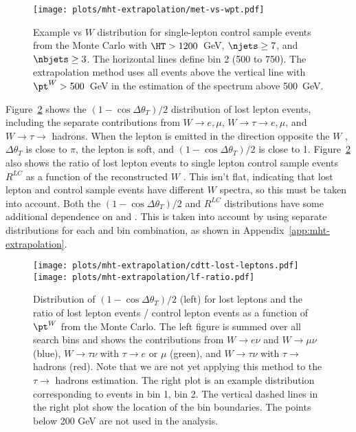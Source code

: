 \begin{figure}[!h]
  \centering
  \texttt{[image: plots/mht-extrapolation/met-vs-wpt.pdf]}
  \caption{ Example \MHT vs $W$ \pt distribution for single-lepton control sample events
    from the \ttbar Monte Carlo with $\HT>1200$~GeV, $\njets\ge 7$, and $\nbjets\ge3$.
    The horizontal lines define \MHT bin 2 (500 to 750).  The \MHT extrapolation
    method uses all events above the vertical line with $\pt^W>500$~GeV in the estimation
    of the \MHT spectrum above 500~GeV.
  }
  \label{fig:met-vs-wpt}
\end{figure}


Figure~\ref{fig:cdtt-lf-ratio} shows the $\left( 1 - \cos \Delta \theta_T \right) / 2$
distribution of lost lepton events, including the separate contributions from $W \to e,\mu$,
$W \to \tau \to e,\mu$, and $W \to \tau \to$ hadrons.
When the lepton is emitted in the direction opposite the $W$ \pt, $\Delta \theta_T$ is close to $\pi$,
the lepton \pt is soft, and $\left( 1 - \cos \Delta \theta_T \right) / 2$ is close to 1.
Figure~\ref{fig:cdtt-lf-ratio} also shows the ratio of lost lepton events  to single lepton control sample
events $R^{LC}$ as a function of the reconstructed $W$ \pt.
This isn't flat, indicating that lost lepton and control sample events have different $W$ \pt spectra,
so this must be taken into account. 
Both the $\left( 1 - \cos \Delta \theta_T \right) / 2$ and $R^{LC}$ distributions have some additional dependence
on \njets and \HT.
This is taken into account by using separate distributions for each \njets and \HT bin combination,
as shown in Appendix~\ref{app:mht-extrapolation}.


\begin{figure}[!h]
  \centering
  \texttt{[image: plots/mht-extrapolation/cdtt-lost-leptons.pdf]}
  \texttt{[image: plots/mht-extrapolation/lf-ratio.pdf]}
  \caption{
    Distribution of $\left( 1 - \cos \Delta \theta_T \right) / 2$ (left) for lost
    leptons and the ratio of lost lepton events / control lepton events as a function of $\pt^W$ from the \ttbar Monte Carlo.
    The left figure is summed over all search bins and shows the contributions from $W \to e \nu$ and $W \to \mu \nu$ (blue),
    $W \to \tau \nu$ with $\tau \to e$ or $\mu$ (green), and $W \to \tau \nu$ with $\tau \to$ hadrons (red).  Note that we are not yet applying this method to the  $\tau \to$ hadrons estimation.
    The right plot is an example distribution corresponding to events in \njets bin 1, \HT bin 2.
    The vertical dashed lines in the right plot show the location of the \MHT bin boundaries.
    The points below 200 GeV are not used in the analysis.
  }
  \label{fig:cdtt-lf-ratio}
\end{figure}


